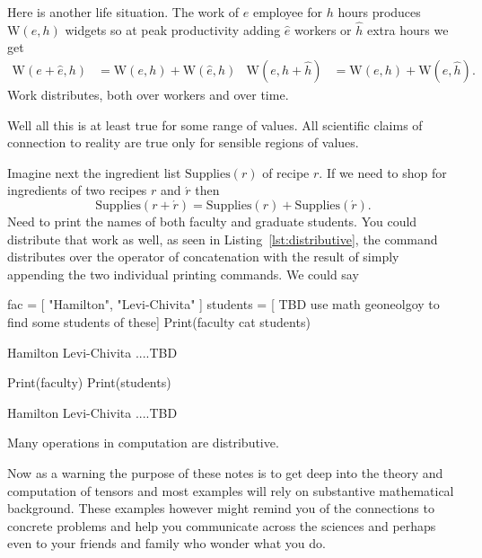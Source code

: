 Here is another life situation.  The work of $e$ employee for $h$ hours produces 
$\text{W}(e,h)$ widgets
so at peak productivity adding $\hat{e}$ workers or $\hat{h}$ extra hours we get
\begin{align*}
    \text{W}(e+\hat{e},h)& =\text{W}(e,h)+\text{W}(\hat{e},h)
    &
    \text{W}(e,h+\hat{h})& =\text{W}(e,h)+\text{W}(e,\hat{h}).
\end{align*}
Work distributes, both over workers and over time.

Well all this is at least true for some range of values.  All scientific
claims of connection to reality are true only for sensible regions of values.

Imagine next the ingredient list 
$\text{Supplies}(r)$ of recipe $r$.  If we need to shop for ingredients of two recipes 
$r$ and $\acute{r}$ then 
\[
    \text{Supplies}(r+\acute{r})=\text{Supplies}(r)+\text{Supplies}(\acute{r}).
\]
Need to print the names of both faculty and graduate students. 
You could distribute that work as well, as seen in Listing~\ref{lst:distributive},
the command  distributes over the operator of concatenation 
with the result of simply appending the two individual printing commands.
We could say 
\begin{center}
\end{center}

\begin{lstfloat}
\begin{notebookin}
fac = [ "Hamilton", "Levi-Chivita" ]
students = [ TBD use math geoneolgoy to find some students of these]
Print(faculty cat students)
\end{notebookin}
\begin{notebookout}
Hamilton
Levi-Chivita
....TBD
\end{notebookout}
\begin{notebookin}
Print(faculty)
Print(students)
\end{notebookin}
\begin{notebookout}
Hamilton
Levi-Chivita
....TBD
\end{notebookout}
\caption{Many operations in computation are distributive.}\label{lst:distributive}
\end{lstfloat}

Now as a warning the purpose of these notes is to get deep into the theory and 
computation of tensors and most examples will rely on substantive mathematical 
background.  These examples however might remind you of the connections to 
concrete problems and help you communicate across the sciences and perhaps 
even to your friends and family who wonder what you do.

